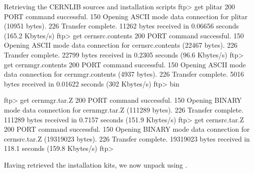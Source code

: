 \begin{XMPt}{Retrieving the CERNLIB sources and installation scripts}
ftp> get plitar
200 PORT command successful.
150 Opening ASCII mode data connection for plitar (10951 bytes).
226 Transfer complete.
11262 bytes received in 0.06656 seconds (165.2 Kbytes/s)
ftp> get cernsrc.contents
200 PORT command successful.
150 Opening ASCII mode data connection for cernsrc.contents (22467 bytes).
226 Transfer complete.
22799 bytes received in 0.2305 seconds (96.6 Kbytes/s)
ftp> get cernmgr.contents
200 PORT command successful.
150 Opening ASCII mode data connection for cernmgr.contents (4937 bytes).
226 Transfer complete.
5016 bytes received in 0.01622 seconds (302 Kbytes/s)
ftp> bin

ftp> get cernmgr.tar.Z
200 PORT command successful.
150 Opening BINARY mode data connection for cernmgr.tar.Z (111289 bytes).
226 Transfer complete.
111289 bytes received in 0.7157 seconds (151.9 Kbytes/s)
ftp> get cernsrc.tar.Z
200 PORT command successful.
150 Opening BINARY mode data connection for cernsrc.tar.Z (19319023 bytes).
226 Transfer complete.
19319023 bytes received in 118.1 seconds (159.8 Kbytes/s)
ftp> 

\end{XMPt}

Having retrieved the installation kits, we now unpack using \plitar{}.

